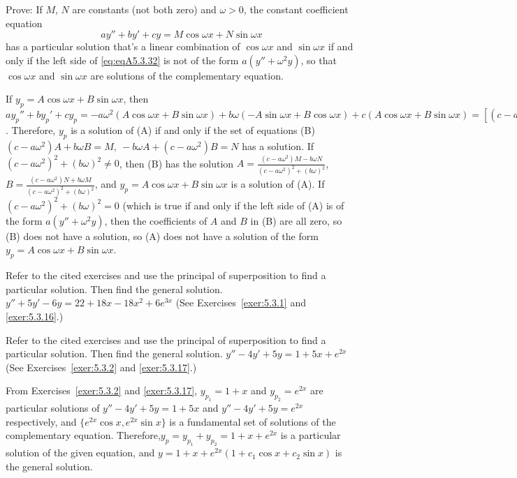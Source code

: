 \documentclass{ximera}
\begin{document}
\begin{problem}\label{exer:5.3.32}
Prove: If $M$, $N$ are constants (not both zero)   and
$\omega>0$,   the constant coefficient equation \begin{equation}\label{eq:eqA5.3.32}
ay''+by'+cy=M\cos\omega x+N\sin\omega x
\end{equation} 
has a particular solution that's a linear combination
of $\cos\omega x$ and $\sin\omega x$
 if and only if the left side of \ref{eq:eqA5.3.32}
is not of the form $a(y''+\omega^2y)$, so that $\cos\omega x$
and $\sin\omega x$ are solutions of the complementary equation.
\begin{solution}
If $y_p=A\cos\omega x+B\sin\omega x$, then
$ay_p''+by_p'+cy_p=-a\omega^2(A\cos\omega
x+B\sin\omega x)+b\omega(-A\sin\omega x+B\cos\omega x)+c(A\cos\omega
x+B\sin\omega x)=\left[(c-a\omega^2)A+b\omega B\right]\cos\omega
x +\left[-b\omega A+(c-a\omega^2)B\right]\sin\omega x$. Therefore,
$y_p$ is a solution of (A) if and only if the set of equations (B)
$(c-a\omega^2)A+b\omega B=M,\ -b\omega A+(c-a\omega^2)B=N$
has a solution. If $(c-a\omega^2)^2+(b\omega)^2\ne0$, then (B)
has the solution
$A=\frac{(c-a\omega^2)M-b\omega N}{(c-a\omega^2)^2+(b\omega)^2}$,
$B=\frac{(c-a\omega^2)N+b\omega M}{(c-a\omega^2)^2+(b\omega)^2}$,
 and $y_p=A\cos\omega x+B\sin\omega x$ is a solution of (A).
If $(c-a\omega^2)^2+(b\omega)^2=0$  (which is true if and only if
the left side of (A) is of the form $a(y''+\omega^2y)$, then
the coefficients of $A$ and $B$ in (B) are all zero, so (B) does not
have a solution, so (A) does not have a solution of the
form $y_p=A\cos\omega x+B\sin\omega x$.
\end{solution}
\end{problem}

\begin{problem}\label{exer:5.3.33} Refer
to the cited exercises and use the principal of superposition to find
a particular solution. Then find the general solution. 
$y''+5y'-6y=22+18x-18x^2+6e^{3x}$
(See Exercises~\ref{exer:5.3.1} and \ref{exer:5.3.16}.)
\end{problem}

\begin{problem}\label{exer:5.3.34} Refer
to the cited exercises and use the principal of superposition to find
a particular solution. Then find the general solution. 
$y''-4y'+5y=1+5x+e^{2x}$
(See Exercises~\ref{exer:5.3.2} and \ref{exer:5.3.17}.)
\begin{solution}
From Exercises~\ref{exer:5.3.2} and \ref{exer:5.3.17},
$y_{p_1}=1+x$ and $y_{p_2}=e^{2x}$  are particular solutions of
$y''-4y'+5y=1+5x$
and
$y''-4y'+5y=e^{2x}$
respectively, and $\{e^{2x}\cos x,e^{2x}\sin x\}$
is a fundamental set of solutions of the  complementary equation.
Therefore,$y_p=y_{p_1}+y_{p_2}=1+x+e^{2x}$
is a particular solution of the given equation, and
$y=1+x+e^{2x}(1+c_1\cos x+c_2\sin x)$
is the general solution.
\end{solution}
\end{problem}
\end{document}
